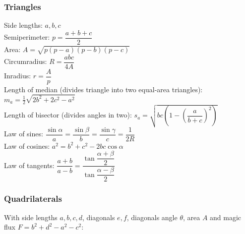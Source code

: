\subsubsection{Triangles}
Side lengths: $a,b,c$\\
Semiperimeter: $p=\dfrac{a+b+c}{2}$\\
Area: $A=\sqrt{p(p-a)(p-b)(p-c)}$\\
Circumradius: $R=\dfrac{abc}{4A}$\\
Inradius: $r=\dfrac{A}{p}$\\
Length of median (divides triangle into two equal-area triangles): $m_a=\tfrac{1}{2}\sqrt{2b^2+2c^2-a^2}$\\
Length of bisector (divides angles in two): $s_a=\sqrt{bc\left(1-\left(\dfrac{a}{b+c}\right)^2\right)}$\\
Law of sines: $\dfrac{\sin\alpha}{a}=\dfrac{\sin\beta}{b}=\dfrac{\sin\gamma}{c}=\dfrac{1}{2R}$\\
Law of cosines: $a^2=b^2+c^2-2bc\cos\alpha$\\
Law of tangents: $\dfrac{a+b}{a-b}=\dfrac{\tan\dfrac{\alpha+\beta}{2}}{\tan\dfrac{\alpha-\beta}{2}}$\\

\subsubsection{Quadrilaterals}
With side lengths $a,b,c,d$, diagonals $e, f$, diagonals angle $\theta$, area $A$ and
magic flux $F=b^2+d^2-a^2-c^2$:

